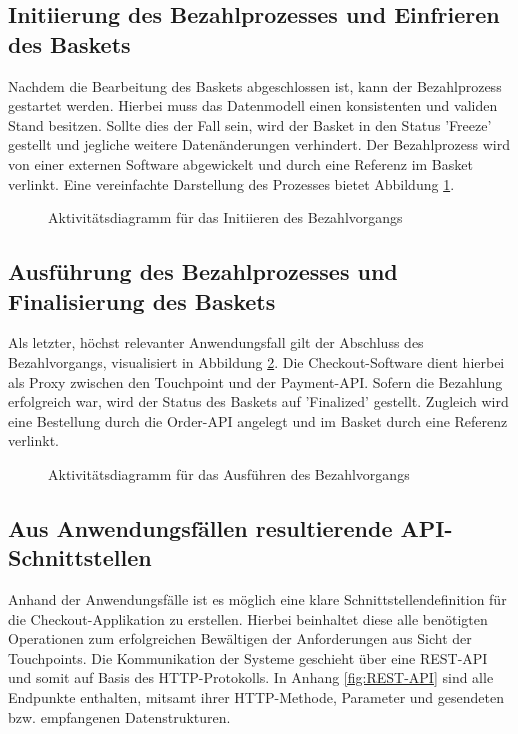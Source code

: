 \subsection{Initiierung des Bezahlprozesses und Einfrieren des Baskets}

Nachdem die Bearbeitung des Baskets abgeschlossen ist, kann der Bezahlprozess gestartet werden. Hierbei muss das Datenmodell einen konsistenten und validen Stand besitzen. Sollte dies der Fall sein, wird der Basket in den Status 'Freeze' gestellt und jegliche weitere Datenänderungen verhindert. Der Bezahlprozess wird von einer externen Software abgewickelt und durch eine Referenz im Basket verlinkt. Eine vereinfachte Darstellung des Prozesses bietet Abbildung \ref{fig:SL-InitPayment}.

\begin{figure}[h!]
	\centering
	
	\caption{Aktivitätsdiagramm für das Initiieren des Bezahlvorgangs }
	\label{fig:SL-InitPayment}
\end{figure}

\subsection{Ausführung des Bezahlprozesses und Finalisierung des Baskets}

Als letzter, höchst relevanter Anwendungsfall gilt der Abschluss des Bezahlvorgangs, visualisiert in Abbildung \ref{fig:SL-ExecPayment}. Die Checkout-Software dient hierbei als Proxy zwischen den Touchpoint und der Payment-API. Sofern die Bezahlung erfolgreich war, wird der Status des Baskets auf 'Finalized' gestellt. Zugleich wird eine Bestellung durch die Order-API angelegt und im Basket durch eine Referenz verlinkt.

\begin{figure}[h!]
	\centering
	
	\caption{Aktivitätsdiagramm für das Ausführen des Bezahlvorgangs }
	\label{fig:SL-ExecPayment}
\end{figure}

\subsection{Aus Anwendungsfällen resultierende API-Schnittstellen }

Anhand der Anwendungsfälle ist es möglich eine klare Schnittstellendefinition für die Checkout-Applikation zu erstellen. Hierbei beinhaltet diese alle benötigten Operationen zum erfolgreichen Bewältigen der Anforderungen aus Sicht der Touchpoints. Die Kommunikation der Systeme geschieht über eine \acrshort{REST}-API und somit auf Basis des \acrshort{HTTP}-Protokolls. In Anhang \ref{fig:REST-API} sind alle Endpunkte enthalten, mitsamt ihrer HTTP-Methode, Parameter und gesendeten bzw. empfangenen Datenstrukturen.

